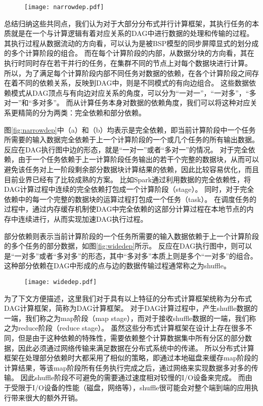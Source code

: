 \begin{figure}[!htp]
    \centering
    \texttt{[image: narrowdep.pdf]}
\end{figure}

总结归纳这些共同点，我们认为对于大部分分布式并行计算框架，其执行任务的本质就是在一个与计算逻辑有着对应关系的DAG中进行数据的处理和传输的过程。
其执行过程从数据流动的方向看，可以认为是被BSP模型的同步屏障显式的划分成的多个计算阶段的组合。
而在每个计算阶段的内部，从数据分块的方向看，其在执行时同时存在若干并行的任务，在集群不同的节点上对每个数据块进行计算。
所以，为了满足每个计算阶段内部不同任务对数据的依赖，在各个计算阶段之间存在着不同的依赖关系，反映到DAG中，则是不同模式的有向边组合。
这些数据依赖模式从DAG顶点与有向边对应关系的角度，可以分为“一对一”，“一对多”，“多对一”和“多对多”。
而从计算任务本身对数据的依赖角度，我们可以将这种对应关系更精简的分为两类：完全依赖和部分依赖。

图\ref{fig:narrowdep}中（a）和（b）均表示是完全依赖，即当前计算阶段中一个任务所需要的输入数据完全依赖于上一个计算阶段的一个或几个任务的所有输出数据。
反应在DAG执行图中边的形态，就是“一对一”或者“多对一”的情况。
对于完全依赖，由于一个任务依赖于上一计算阶段任务输出的若干个完整的数据块，从而可以避免该任务对上一阶段剩余部分数据块计算结果的依赖，因此比较容易优化，而且目前业界已经有了比较成熟的方案。
比如Spark通过利用数据的完全依赖性，将DAG计算过程中连续的完全依赖打包成一个计算阶段（stage）。
同时，对于完全依赖中的每一个完整的数据块的运算过程打包成一个任务（task）。
在调度任务的过程中，通过内存缓存机制使DAG中完全依赖的这部分计算过程在本地节点的内存中连续进行，从而实现加速DAG执行过程。

部分依赖则表示当前计算阶段的一个任务所需要的输入数据依赖于上一个计算阶段的多个任务的部分数据，如图\ref{fig:widedep}所示。
反应在DAG执行图中，则可以是“一对多”或者“多对多”的形态，其中“多对多”本质上则是多个“一对多”的组合。
这种部分依赖在DAG中形成的点与边的数据传输过程通常称之为shuffle。

\begin{figure}[!htp]
    \centering
    \texttt{[image: widedep.pdf]}
\end{figure}

为了下文方便描述，这里我们对于具有以上特征的分布式计算框架统称为分布式DAG计算框架，简称为DAG计算框架。
对于DAG计算过程中，产生shuffle数据的一端，我们称之为map阶段（map stage），而对于接收shuffle数据的一端，我们称之为reduce阶段（reduce stage）。
虽然这些分布式计算框架在设计上存在很多不同，但是由于这种依赖的特殊性，需要依赖整个计算数据集中所有分区的部分数据，因此必须通过网络传输来满足数据在分布式系统中的传递。
所以分布式计算框架在处理部分依赖时大都采用了相似的策略，即通过本地磁盘来缓存map阶段的计算结果，等该map阶段所有任务执行完成之后，通过网络来实现数据多对多的传输。
因此shuffle阶段不可避免的需要通过速度相对较慢的I/O设备来完成。
而由于受限于I/O设备的性能（磁盘，网络等），shuffle很可能会对整个端到端的应用执行带来很大的额外开销。

